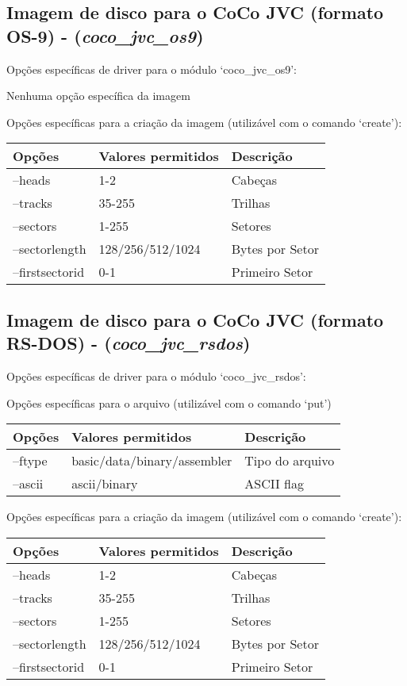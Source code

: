 \documentclass[letterpaper,10pt,brazil]{sphinxmanual}
\begin{document}
\subsection{Imagem de disco para o CoCo JVC (formato OS-9) - (\emph{coco\_jvc\_os9})}
\label{tools/imgtool:imagem-de-disco-para-o-coco-jvc-formato-os-9-coco-jvc-os9}
Opções específicas de driver para o módulo `coco\_jvc\_os9':

Nenhuma opção específica da imagem

Opções específicas para a criação da imagem (utilizável com o comando `create'):

\noindent\begin{tabulary}{\linewidth}{|L|L|L|}
\hline

Opções
&
Valores permitidos
&
Descrição
\\
\hline
--heads
&
1-2
&
Cabeças
\\
\hline
--tracks
&
35-255
&
Trilhas
\\
\hline
--sectors
&
1-255
&
Setores
\\
\hline
--sectorlength
&
128/256/512/1024
&
Bytes por Setor
\\
\hline
--firstsectorid
&
0-1
&
Primeiro Setor
\\
\hline\end{tabulary}



\subsection{Imagem de disco para o CoCo JVC (formato RS-DOS) - (\emph{coco\_jvc\_rsdos})}
\label{tools/imgtool:imagem-de-disco-para-o-coco-jvc-formato-rs-dos-coco-jvc-rsdos}
Opções específicas de driver para o módulo `coco\_jvc\_rsdos':

Opções específicas para o arquivo (utilizável com o comando `put')

\noindent\begin{tabulary}{\linewidth}{|L|L|L|}
\hline

Opções
&
Valores permitidos
&
Descrição
\\
\hline
--ftype
&
basic/data/binary/assembler
&
Tipo do arquivo
\\
\hline
--ascii
&
ascii/binary
&
ASCII flag
\\
\hline\end{tabulary}


Opções específicas para a criação da imagem (utilizável com o comando `create'):

\noindent\begin{tabulary}{\linewidth}{|L|L|L|}
\hline

Opções
&
Valores permitidos
&
Descrição
\\
\hline
--heads
&
1-2
&
Cabeças
\\
\hline
--tracks
&
35-255
&
Trilhas
\\
\hline
--sectors
&
1-255
&
Setores
\\
\hline
--sectorlength
&
128/256/512/1024
&
Bytes por Setor
\\
\hline
--firstsectorid
&
0-1
&
Primeiro Setor
\\
\hline\end{tabulary}
\end{document}
